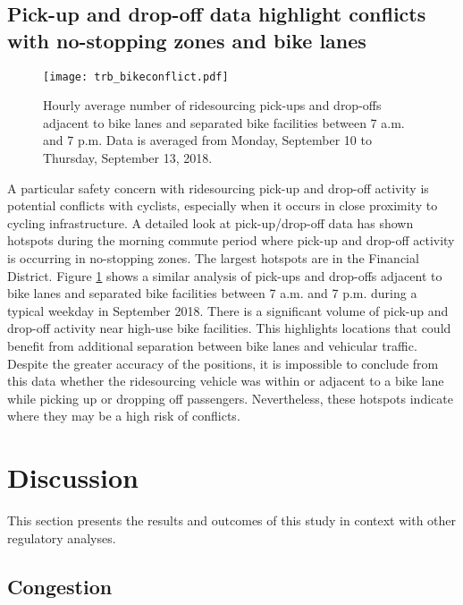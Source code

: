 \documentclass[]{trbunofficial_bdit_final}
\begin{document}
\hypertarget{pick-up-and-drop-off-data-highlight-conflicts-with-no-stopping-zones-and-bike-lanes}{%
\subsection{Pick-up and drop-off data highlight conflicts with no-stopping zones and bike lanes}\label{pick-up-and-drop-off-data-highlight-conflicts-with-no-stopping-zones-and-bike-lanes}}

\begin{figure}
\centering
\texttt{[image: trb\_bikeconflict.pdf]}
\caption{Hourly average number of ridesourcing pick-ups and drop-offs adjacent to bike
lanes and separated bike facilities between 7 a.m. and 7 p.m. Data is averaged
from Monday, September 10 to Thursday, September 13, 2018.
\label{fig:bikeconflict}}
\end{figure}

A particular safety concern with ridesourcing pick-up and drop-off activity is
potential conflicts with cyclists, especially when it occurs in close proximity
to cycling infrastructure. A detailed look at pick-up/drop-off data has shown hotspots during the morning
commute period where pick-up and drop-off activity is occurring in no-stopping
zones. The largest hotspots are in the Financial District. Figure
\ref{fig:bikeconflict} shows a similar analysis of pick-ups and drop-offs
adjacent to bike lanes and separated bike facilities between 7 a.m. and 7 p.m.
during a typical weekday in September 2018. There is a significant volume of
pick-up and drop-off activity near high-use bike facilities. This highlights
locations that could benefit from additional separation between bike lanes and
vehicular traffic. Despite the greater accuracy of the positions, it is
impossible to conclude from this data whether the ridesourcing vehicle was
within or adjacent to a bike lane while picking up or dropping off passengers.
Nevertheless, these hotspots indicate where they may be a high risk of
conflicts.

\hypertarget{sec:discussion}{%
\section{Discussion}\label{sec:discussion}}

This section presents the results and outcomes of this study in context with
other regulatory analyses.

\hypertarget{sec:congestion}{%
\subsection{Congestion}\label{sec:congestion}}
\end{document}

